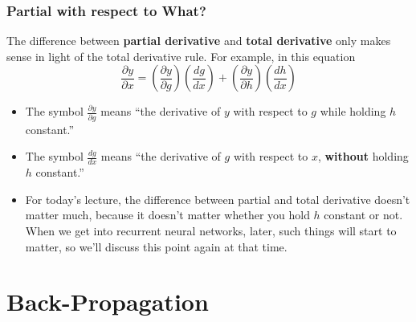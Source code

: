\documentclass{beamer}
\begin{document}
\begin{frame}
  \frametitle{Partial with respect to What?}

  The difference between {\bf partial derivative} and {\bf total
    derivative} only makes sense in light of the total derivative
  rule. For example, in this equation 
  \begin{displaymath}
    \frac{\partial y}{\partial x} =
    \left(\frac{\partial y}{\partial g}\right)\left(\frac{dg}{dx}\right) +
    \left(\frac{\partial y}{\partial h}\right)\left(\frac{dh}{dx}\right)
  \end{displaymath}
  \begin{itemize}
  \item The symbol $\frac{\partial y}{\partial g}$ means ``the
    derivative of $y$ with respect to $g$ while holding $h$ constant.''
  \item The symbol $\frac{dg}{dx}$ means ``the derivative of $g$ with
    respect to $x$, {\bf without} holding $h$ constant.''
  \item For today's lecture, the difference between partial and total
    derivative doesn't matter much, because it doesn't matter whether
    you hold $h$ constant or not.  When we get into recurrent neural
    networks, later, such things will start to matter, so we'll
    discuss this point again at that time.
  \end{itemize}
\end{frame}

\section[Back-Propagation]{Back-Propagation}
\setcounter{subsection}{1}
\end{document}
